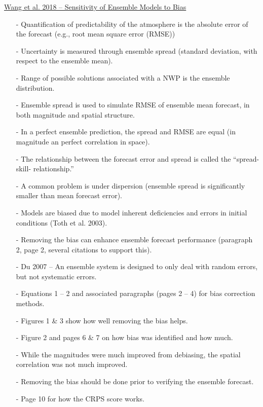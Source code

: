 \documentclass[12pt, letterpaper]{article}
\begin{document}
    \underline{Wang et al. 2018 -- Sensitivity of Ensemble Models to Bias}
    \begin{itemize}
    	\item[-] Quantification of predictability of the atmosphere is the absolute error of the forecast
    	         (e.g., root mean square error (RMSE))
    	\item[-] Uncertainty is measured through ensemble spread (standard deviation, with respect to the
    	         ensemble mean).
    	\item[-] Range of possible solutions associated with a NWP is the ensemble distribution.
    	\item[-] Ensemble spread is used to simulate RMSE of ensemble mean forecast, in both magnitude
    	         and spatial structure.
    	\item[-] In a perfect ensemble prediction, the spread and RMSE are equal (in magnitude an perfect
    	         correlation in space).
    	\item[-] The relationship between the forecast error and spread is called the ``spread-skill-
    	         relationship.''
    	\item[-] A common problem is under dispersion (ensemble spread is significantly smaller than
    	         mean forecast error).
    	\item[-] Models are biased due to model inherent deficiencies and errors in initial conditions
    	         (Toth et al. 2003).
    	\item[-] Removing the bias can enhance ensemble forecast performance (paragraph 2, page 2, several
    	         citations to support this).
    	\item[-] Du 2007 -- An ensemble system is designed to only deal with random errors, but not
    	         systematic errors.
    	\item[-] Equations 1 -- 2 and associated paragraphs (pages 2 -- 4) for bias correction methods.
    	\item[-] Figures 1 \& 3 show how well removing the bias helps.
    	\item[-] Figure 2 and pages 6 \& 7 on how bias was identified and how much.
    	\item[-] While the magnitudes were much improved from debiasing, the spatial correlation was not
    	         much improved.
    	\item[-] Removing the bias should be done prior to verifying the ensemble forecast.
    	\item[-] Page 10 for how the CRPS score works.

\end{itemize}
\end{document}
